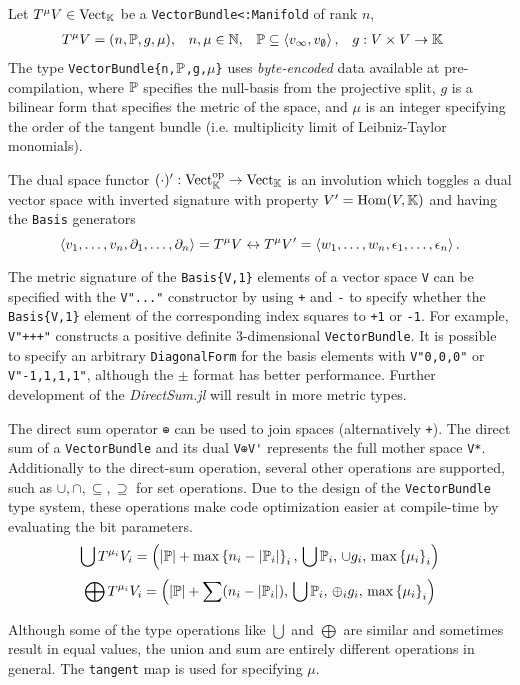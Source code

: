 \documentclass[]{article}
\begin{document}
\begin{definition}
	Let $T^\mu V\in\text{Vect}_{\mathbb{K}}$ be a \verb`VectorBundle<:Manifold` of rank $n$,
	\begin{align*}
		T^\mu V &= (n,\mathbb{P},g,\mu), & n,\mu &\in\mathbb{N}, & \mathbb{P} &\subseteq\left\langle v_\infty,v_\emptyset \right\rangle, & g &:V\times V\rightarrow\mathbb{K}
	\end{align*}
	The type \verb+VectorBundle{n,+$\mathbb{P}$\verb+,g,+$\mu$\verb+}+ uses \textit{byte-encoded} data available at pre-compilation, where
	$\mathbb{P}$ specifies the null-basis from the projective split,
	$g$ is a bilinear form that specifies the metric of the space,
	and $\mu$ is an integer specifying the order of the tangent bundle (i.e. multiplicity limit of Leibniz-Taylor monomials).

	The dual space functor $(\cdot)':\text{Vect}_{\mathbb{K}}^\text{op}\rightarrow\text{Vect}_{\mathbb{K}}$ 
	is an involution which toggles a dual vector space with inverted signature with property $V' = \text{Hom}(V,\mathbb{K})$ and having the \verb`Basis` generators
	$$\left\langle v_1,\dots,v_n,\partial_1,\dots,\partial_n \right\rangle=T^\mu V\leftrightarrow T^\mu V' = \left\langle w_1,\dots,w_n,\epsilon_1,\dots,\epsilon_n \right\rangle.$$

	The metric signature of the \verb+Basis{V,1}+ elements of a vector space \verb+V+ can be specified with the \verb+V"..."+ constructor by using \verb-+- and \verb+-+ to specify whether the \verb+Basis{V,1}+ element of the corresponding index squares to \verb`+1` or \verb`-1`.
	For example, \verb`V"+++"` constructs a positive definite 3-dimensional \verb`VectorBundle`.
	It is possible to specify an arbitrary \verb`DiagonalForm` for the basis elements with \verb`V"0,0,0"` or \verb`V"-1,1,1,1"`, although the $\pm$ format has better performance.
	Further development of the \textit{DirectSum.jl} will result in more metric types.

	The direct sum operator \verb`⊕` can be used to join spaces (alternatively \verb`+`).
	The direct sum of a \verb`VectorBundle` and its dual \verb`V⊕V'` represents the full mother space \verb`V*`.
	Additionally to the direct-sum operation, several other operations are supported, such as $\cup,\cap,\subseteq,\supseteq$ for set operations.
	Due to the design of the \verb`VectorBundle` type system, these operations make code optimization easier at compile-time by evaluating the bit parameters.
	$$ \bigcup T^{\mu_i}V_i = \left(|\mathbb{P}|+\max\left\{ n_i-|\mathbb{P}_i| \right\}_i,\, \bigcup \mathbb{P}_i,\, \cup g_i,\, \max\left\{ \mu_i \right\}_i\right) $$
	$$ \bigoplus T^{\mu_i}V_i = \left(\left|\mathbb{P}\right|+\sum (n_i-|\mathbb{P}_i|),\, \bigcup \mathbb{P}_i,\, \oplus_i g_i,\,\max\left\{ \mu_i \right\}_i\right) $$
\end{definition}
\begin{note}
	Although some of the type operations like $\bigcup$ and $\bigoplus$ are similar and sometimes result in equal values, the union and sum are entirely different operations in general. The \verb`tangent` map is used for specifying $\mu$.
\end{note}
\end{document}
